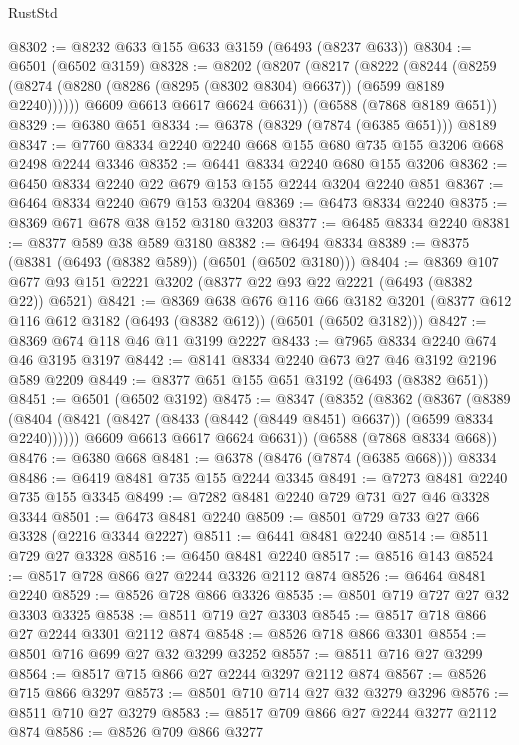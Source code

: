 \begin{lexlean}{RustStd}
\begin{coremodule}
@8302 := @8232 @633 @155 @633 @3159 (@6493 (@8237 @633))
@8304 := @6501 (@6502 @3159)
@8328 := @8202
    (@8207
      (@8217
        (@8222
          (@8244 (@8259 (@8274 (@8280 (@8286 (@8295 (@8302 @8304) @6637)) (@6599 @8189 @2240))))))
        @6609
        @6613
        @6617
        @6624
        @6631))
    (@6588 (@7868 @8189 @651))
@8329 := @6380 @651
@8334 := @6378 (@8329 (@7874 (@6385 @651))) @8189
@8347 := @7760 @8334 @2240 @2240 @668 @155 @680 @735 @155 @3206 @668 @2498 @2244 @3346
@8352 := @6441 @8334 @2240 @680 @155 @3206
@8362 := @6450 @8334 @2240 @22 @679 @153 @155 @2244 @3204 @2240 @851
@8367 := @6464 @8334 @2240 @679 @153 @3204
@8369 := @6473 @8334 @2240
@8375 := @8369 @671 @678 @38 @152 @3180 @3203
@8377 := @6485 @8334 @2240
@8381 := @8377 @589 @38 @589 @3180
@8382 := @6494 @8334
@8389 := @8375 (@8381 (@6493 (@8382 @589)) (@6501 (@6502 @3180)))
@8404 := @8369 @107 @677 @93 @151 @2221 @3202 (@8377 @22 @93 @22 @2221 (@6493 (@8382 @22)) @6521)
@8421 := @8369
    @638
    @676
    @116
    @66
    @3182
    @3201
    (@8377 @612 @116 @612 @3182 (@6493 (@8382 @612)) (@6501 (@6502 @3182)))
@8427 := @8369 @674 @118 @46 @11 @3199 @2227
@8433 := @7965 @8334 @2240 @674 @46 @3195 @3197
@8442 := @8141 @8334 @2240 @673 @27 @46 @3192 @2196 @589 @2209
@8449 := @8377 @651 @155 @651 @3192 (@6493 (@8382 @651))
@8451 := @6501 (@6502 @3192)
@8475 := @8347
    (@8352
      (@8362
        (@8367
          (@8389 (@8404 (@8421 (@8427 (@8433 (@8442 (@8449 @8451) @6637)) (@6599 @8334 @2240))))))
        @6609
        @6613
        @6617
        @6624
        @6631))
    (@6588 (@7868 @8334 @668))
@8476 := @6380 @668
@8481 := @6378 (@8476 (@7874 (@6385 @668))) @8334
@8486 := @6419 @8481 @735 @155 @2244 @3345
@8491 := @7273 @8481 @2240 @735 @155 @3345
@8499 := @7282 @8481 @2240 @729 @731 @27 @46 @3328 @3344
@8501 := @6473 @8481 @2240
@8509 := @8501 @729 @733 @27 @66 @3328 (@2216 @3344 @2227)
@8511 := @6441 @8481 @2240
@8514 := @8511 @729 @27 @3328
@8516 := @6450 @8481 @2240
@8517 := @8516 @143
@8524 := @8517 @728 @866 @27 @2244 @3326 @2112 @874
@8526 := @6464 @8481 @2240
@8529 := @8526 @728 @866 @3326
@8535 := @8501 @719 @727 @27 @32 @3303 @3325
@8538 := @8511 @719 @27 @3303
@8545 := @8517 @718 @866 @27 @2244 @3301 @2112 @874
@8548 := @8526 @718 @866 @3301
@8554 := @8501 @716 @699 @27 @32 @3299 @3252
@8557 := @8511 @716 @27 @3299
@8564 := @8517 @715 @866 @27 @2244 @3297 @2112 @874
@8567 := @8526 @715 @866 @3297
@8573 := @8501 @710 @714 @27 @32 @3279 @3296
@8576 := @8511 @710 @27 @3279
@8583 := @8517 @709 @866 @27 @2244 @3277 @2112 @874
@8586 := @8526 @709 @866 @3277

\end{coremodule}
\end{lexlean}
